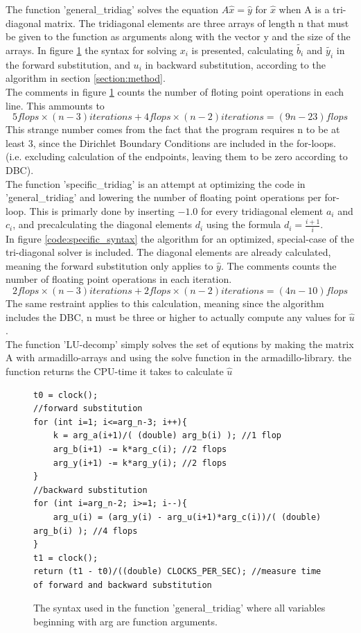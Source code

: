 \documentclass[11pt,a4paper,notitlepage]{article}
\begin{document}
	The function 'general\_tridiag' solves the equation $A\hat{x} = \hat{y}$ for $\hat{x}$ when A is a tri-diagonal matrix.
	The tridiagonal elements are three arrays of length n that must be given to the function as arguments along with the vector y and the size of the arrays. In figure \ref{code:general_syntax} the syntax for solving $x_i$ is presented, calculating $\tilde{b_i}$ and $\tilde{y_i}$ in the forward substitution, and $u_i$ in backward substitution, according to the algorithm in section \ref{section:method}. \\
	The comments in figure \ref{code:general_syntax} counts the number of floting point operations in each line. This ammounts to $$5 flops\times(n-3)iterations + 4 flops \times (n-2)iterations = (9n - 23) flops $$ This strange number comes from the fact that the program requires n to be at least 3, since the Dirichlet Boundary Conditions are included in the for-loops. (i.e. excluding calculation of the endpoints, leaving them to be zero according to DBC).\\
	
	The function 'specific\_tridiag' is an attempt at optimizing the code in 'general\_tridiag' and lowering the  number of floating point operations per for-loop. This is primarly done by inserting $-1.0$ for every tridiagonal element $a_i$ and $c_i$, and precalculating the diagonal elements $d_i$ using the formula $d_i = \frac{i+1}{i}$. \\ %
	In figure \ref{code:specific_syntax} the algorithm for an optimized, special-case of the tri-diagonal solver is included. The diagonal elements are already calculated, meaning the forward substitution only applies to $\hat{y}$. The comments counts the number of floating point operations in each iteration. $$ 2flops\times(n-3)iterations + 2flops\times(n-2)iterations = (4n - 10)flops$$ The same restraint applies to this calculation, meaning since the algorithm includes the DBC, n must be three or higher to actually compute any values for $\hat{u}$. \\
	The function 'LU-decomp' simply solves the set of equtions by making the matrix A with armadillo-arrays and using the solve function in the armadillo-library. the function returns the CPU-time it takes to calculate $\hat{u}$
	
\begin{figure}
\label{code:general_syntax}
\lstset{style=c++style}
\begin{lstlisting}[frame=single]
t0 = clock();
//forward substitution
for (int i=1; i<=arg_n-3; i++){
    k = arg_a(i+1)/( (double) arg_b(i) ); //1 flop
    arg_b(i+1) -= k*arg_c(i); //2 flops
    arg_y(i+1) -= k*arg_y(i); //2 flops
}
//backward substitution
for (int i=arg_n-2; i>=1; i--){
  	arg_u(i) = (arg_y(i) - arg_u(i+1)*arg_c(i))/( (double) arg_b(i) ); //4 flops
}
t1 = clock();
return (t1 - t0)/((double) CLOCKS_PER_SEC); //measure time of forward and backward substitution
\end{lstlisting}
\caption{The syntax used in the function 'general\_tridiag' where all variables beginning with arg are function arguments.}
\end{figure}
	
\end{document}
